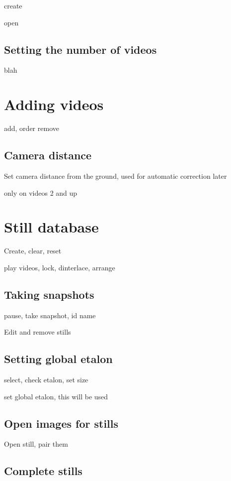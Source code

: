 \documentclass[10pt,a4paper,oneside]{report}             %
\begin{document}
create

open

\subsection{Setting the number of videos}

blah

\section{Adding videos}

add, order remove

\subsection{Camera distance}

Set camera distance from the ground, used for automatic correction later

only on videos 2 and up

\section{Still database}

Create, clear, reset

play videos, lock, dinterlace, arrange

\subsection{Taking snapshots}

pause, take snapshot, id name

Edit and remove stills

\subsection{Setting global etalon}

select, check etalon, set size

set global etalon, this will be used

\subsection{Open images for stills} \label{sec:openStill}

Open still, pair them

\subsection{Complete stills} \label{sec:compStill}
\end{document}
